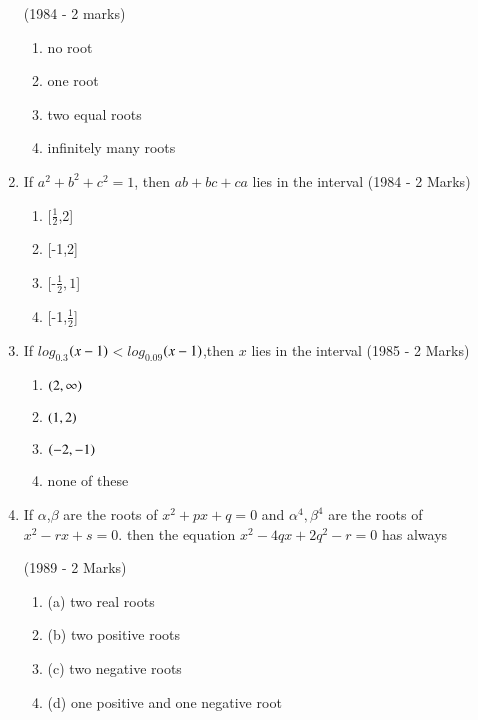\documentclass[journal,12pt,twocolumn]{IEEEtran}
\theoremstyle{remark}
\begin{document}
\begin{enumerate}
\hfill (1984 - 2 marks)
\begin{enumerate}
\item no root\item one root\item two equal roots\item infinitely many roots 
\end{enumerate}
\item  If $a^2+b^2+c^2=1$, then $ab+bc+ca$ lies in the interval \hfill (1984 - 2 Marks)
\begin{enumerate}
\item {[$\frac{1}{2}$,2]}\item {[-1,2]}\item {[-$\frac{1}{2},1$]}\item {[-1,$\frac{1}{2}$]}
\end{enumerate}
\item   If $log_{0.3}$$\left(x-1\right)$$<$$log_{0.09}$$\left(x-1\right)$,then $x$ lies in the interval 
\hfill (1985 - 2 Marks)
\begin{enumerate}
\item $\left(2,\infty\right)$\item $\left(1,2\right)$\item $\left(-2,-1\right)$\item none of these
\end{enumerate}
\item If $\alpha$,$\beta$ are the roots of $x^2+px+q=0$ and $\alpha^4,\beta^4$ are the roots of $x^2-rx+s=0$. then the equation $x^2-4qx+2q^2-r=0$ has always
 
\hfill(1989 - 2 Marks)
\begin{enumerate}
\item(a) two real roots\item(b) two positive roots\item(c) two negative roots\item(d) one positive and one negative root
\end{enumerate}
\end{enumerate}
\end{document}

